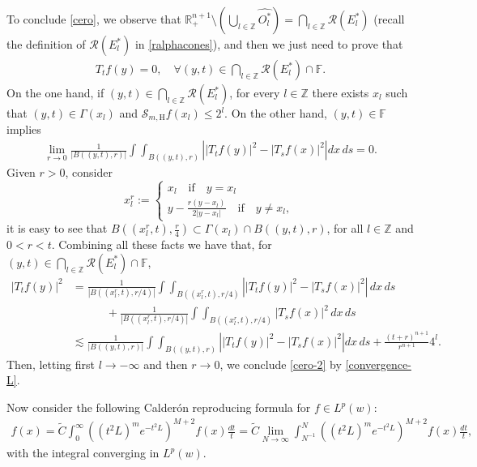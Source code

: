 \documentclass[11pt, a4paper,leqno]{amsart}
\theoremstyle{plain}
\theoremstyle{definition}
\theoremstyle{remark}
\numberwithin{equation}{section}
\def \R{ \mathbb{R} }
\def \Z{ \mathbb{Z} }
\def \Scal{ \mathcal{S} }
\def \hh{ \mathrm{H} }
\def \iint{\int\!\!\!\int}
\begin{document}
 To conclude \eqref{cero}, we observe that $\R^{n+1}_+\setminus\left(\bigcup_{l\in \Z} \widehat{O^*_l}\right)=\bigcap_{l\in \Z}\mathcal{R}(E^*_l)$ (recall the definition of $\mathcal{R}(E^*_l)$ in \eqref{ralphacones}), and then we just need to prove that
\begin{align}\label{cero-2}
T_tf(y)=0,\quad \forall (y,t)\in \bigcap_{l\in \Z}\mathcal{R}(E^*_l)\cap  \mathbb{F}.
\end{align}
On the one hand, if $(y,t)\in \bigcap_{l\in \Z}\mathcal{R}(E^*_l)$, for  every $l\in \Z$ there exists $x_l$ such that $(y,t)\in \Gamma(x_l)$ and $\Scal_{m,\hh}f(x_l)\leq 2^l$. On the other hand,  $(y,t)\in \mathbb{F}$ implies
\begin{align}\label{convergence-L}
\lim_{r\rightarrow 0}\frac{1}{|B((y,t),r)|}\iint_{B((y,t),r)}
\left||T_tf(y)|^2-|T_sf(x)|^2\right|dx\,ds=0.
\end{align}
Given $r>0$, consider
$$ 
x_l^r:=\begin{cases}
x_l\quad \textrm{if} \quad y=x_l\\
y-\frac{r(y-x_l)}{2|y-x_l|}\quad \textrm{if} \quad y\neq x_l,\,
\end{cases} 
$$
it is easy to see that $B\left((x_l^r,t),\frac{r}{4}\right)\subset \Gamma(x_l)\cap B((y,t),r)$, for all $l\in \Z$ and $0<r<t$.
 Combining all these facts we have that, for $(y,t)\in \bigcap_{l\in \Z}\mathcal{R}(E^*_l)\cap  \mathbb{F}$,
\begin{align*}
|T_tf(y)|^2&=\frac{1}{|B((x_l^r,t),r/4)|}\iint_{B((x_l^r,t),r/4)}\left||T_tf(y)|^2-|T_sf(x)|^2\right|\,dx\,ds
\\&\qquad\quad
+
\frac{1}{|B((x_l^r,t),r/4)|}\iint_{B((x_l^r,t),r/4)}|T_sf(x)|^2\,dx\,ds
\\&
\lesssim
\frac{1}{|B((y,t),r)|}\iint_{B((y,t),r)}\left||T_tf(y)|^2-|T_sf(x)|^2\right|dx\,ds
+
\frac{(t+r)^{n+1}}{r^{n+1}}4^l.
\end{align*}
Then, letting first $l\rightarrow -\infty$ and then  $r\rightarrow 0$,  we conclude \eqref{cero-2} by \eqref{convergence-L}.


Now consider 
the following Calder{\'o}n reproducing formula for $f\in L^p(w)$:
\begin{align}\label{formula-CRF-Lpw}
f(x)=\widetilde{C}\int_{0}^{\infty}\left((t^2L)^me^{-t^2L}\right)^{M+2}f(x)\frac{dt}{t}
=\widetilde{C}\lim_{N\rightarrow \infty}
\int_{N^{-1}}^{N}\left((t^2L)^me^{-t^2L}\right)^{M+2}
f(x)\frac{dt}{t},
\end{align}
with the integral converging in $L^p(w)$.
\end{document}
